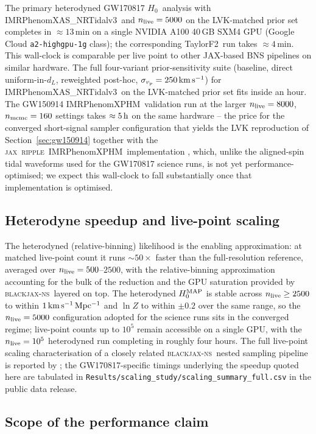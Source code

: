 \documentclass[usenatbib]{mnras}
\newcommand{\kmsmpc}{\ensuremath{\,\rm km\,s^{-1}\,Mpc^{-1}}\xspace}
\newcommand{\kms}{\ensuremath{\,\rm km\,s^{-1}}\xspace}
\newcommand{\hzero}{\ensuremath{H_{0}}\xspace}
\newcommand{\sigmavp}{\ensuremath{\sigma_{v_p}}\xspace}
\newcommand{\IMRX}{IMRPhenomXAS\_NRTidalv3\xspace}
\newcommand{\XPHM}{IMRPhenomXPHM\xspace}
\newcommand{\TF}{TaylorF2\xspace}
\newcommand{\bjns}{\textsc{blackjax-ns}\xspace}
\newcommand{\jax}{\textsc{jax}\xspace}
\newcommand{\ripple}{\textsc{ripple}\xspace}
\begin{document}
The primary heterodyned GW170817 \hzero\ analysis with \IMRX\ and $n_{\rm live}=5000$ on the LVK-matched prior set completes in $\approx 13$\,min on a single NVIDIA A100 40\,GB SXM4 GPU (Google Cloud \texttt{a2-highgpu-1g} class); the corresponding \TF\ run takes $\approx 4$\,min. This wall-clock is comparable per live point to other JAX-based BNS pipelines \citep{Wong2023Jim,Wouters2024JimBNS} on similar hardware. The full four-variant prior-sensitivity suite (baseline, direct uniform-in-$d_L$, reweighted post-hoc, $\sigmavp=250\kms$) for \IMRX\ on the LVK-matched prior set fits inside an hour. The GW150914 \XPHM\ validation run at the larger $n_{\rm live}=8000$, $n_{\rm mcmc}=160$ settings takes $\approx 5\,\rm h$ on the same hardware -- the price for the converged short-signal sampler configuration that yields the LVK reproduction of Section~\ref{sec:gw150914} together with the \jax\ \ripple\ \XPHM\ implementation \citep{Edwards2023Ripple}, which, unlike the aligned-spin tidal waveforms used for the GW170817 science runs, is not yet performance-optimised; we expect this wall-clock to fall substantially once that implementation is optimised.

\subsection{Heterodyne speedup and live-point scaling}
\label{sec:speedup}

The heterodyned (relative-binning) likelihood is the enabling approximation: at matched live-point count it runs ${\sim}50\times$ faster than the full-resolution reference, averaged over $n_{\rm live}=500$--$2500$, with the relative-binning approximation accounting for the bulk of the reduction and the GPU saturation provided by \bjns\ layered on top. The heterodyned $\hzero^{\rm MAP}$ is stable across $n_{\rm live}\geq 2500$ to within $1\kmsmpc$ and $\ln Z$ to within $\pm 0.2$ over the same range, so the $n_{\rm live}=5000$ configuration adopted for the science runs sits in the converged regime; live-point counts up to $10^{5}$ remain accessible on a single GPU, with the $n_{\rm live}=10^{5}$ heterodyned run completing in roughly four hours. The full live-point scaling characterisation of a closely related \bjns\ nested sampling pipeline is reported by \citet{Prathaban2025GPUSpeed}; the GW170817-specific timings underlying the speedup quoted here are tabulated in \texttt{Results/scaling\_study/scaling\_summary\_full.csv} in the public data release.

\subsection{Scope of the performance claim}
\end{document}

